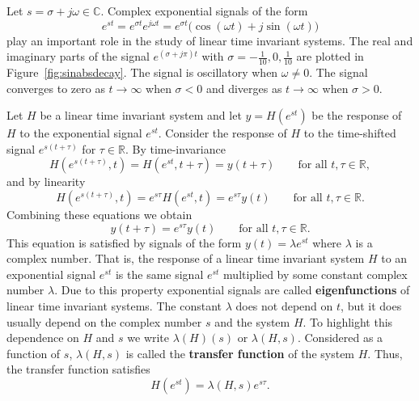 \documentclass[11pt,a4paper]{book}
\theoremstyle{plain}
\numberwithin{equation}{section}
\newcommand{\reals}{{\mathbb R}}
\newcommand{\complex}{{\mathbb C}}
\newcommand{\term}{\textbf}
\begin{document}
Let $s = \sigma + j \omega \in \complex$.  Complex exponential signals of the form 
\[
e^{st} = e^{\sigma t}e^{j \omega t} = e^{\sigma t} \big( \cos(\omega t) + j \sin(\omega t) \big)
\]
play an important role in the study of linear time invariant systems.  The real and imaginary parts of the signal $e^{(\sigma + j\pi)t}$ with $\sigma = -\tfrac{1}{10},0,\tfrac{1}{10}$ are plotted in Figure~\ref{fig:sinabsdecay}.  The signal is oscillatory when $\omega \neq 0$.  The signal converges to zero as $t\to\infty$ when $\sigma<0$ and diverges as $t\to\infty$ when $\sigma > 0$.  

Let $H$ be a linear time invariant system and let $y = H(e^{st})$ be the response of $H$ to the exponential signal $e^{st}$.  Consider the response of $H$ to the time-shifted signal $e^{s(t+\tau)}$ for $\tau \in \reals$.  By time-invariance
\[
H(e^{s(t+\tau)},t) = H(e^{st}, t+\tau) = y(t + \tau) \qquad \text{for all $t, \tau \in \reals$},
\]
and by linearity
\[
H(e^{s(t+\tau)},t) = e^{s\tau} H(e^{st}, t)  = e^{s\tau} y(t) \qquad \text{for all $t, \tau \in \reals$}.
\]
Combining these equations we obtain
\[
y(t + \tau) = e^{s\tau} y(t) \qquad \text{for all $t,\tau \in \reals$}.
\]
This equation is satisfied by signals of the form $y(t) = \lambda e^{st}$ where $\lambda$ is a complex number.  That is, the response of a linear time invariant system $H$ to an exponential signal $e^{st}$ is the same signal $e^{st}$ multiplied by some constant complex number $\lambda$.  Due to this property exponential signals are called \term{eigenfunctions} of linear time invariant systems.  The constant $\lambda$ does not depend on $t$, but it does usually depend on the complex number $s$ and the system $H$.  To highlight this dependence on $H$ and $s$ we write $\lambda(H)(s)$ or $\lambda(H,s)$.  Considered as a function of $s$, $\lambda(H,s)$ is called the \term{transfer function} of the system $H$. 
Thus, the transfer function satisfies
\begin{equation}\label{eq:transfuneigenproperty}
H(e^{st}) = \lambda(H,s) e^{s\tau}.
\end{equation}

\end{document}
